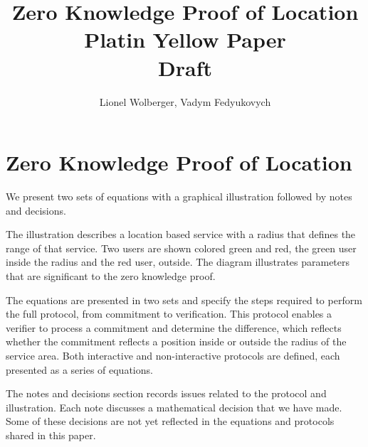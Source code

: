 \documentclass{article}
\begin{document}
\pagecolor{yellow}


\title{
	Zero Knowledge Proof of Location\\
	\small{
	Platin Yellow Paper\\
	Draft}
}
\author{Lionel Wolberger, Vadym Fedyukovych}
\maketitle

\section{Zero Knowledge Proof of Location}

We present two sets of equations with a graphical illustration followed by notes and decisions. 

The illustration describes a location based service with a radius that defines the range of that service. Two users are shown colored green and red, the green user inside the radius and the red user, outside. The diagram illustrates parameters that are significant to the zero knowledge proof. 

The equations are presented in two sets and specify the steps required to perform the full protocol, from commitment to verification. This protocol enables a verifier to process a commitment and determine the difference, which reflects whether the commitment reflects a position inside or outside the radius of the service area. Both interactive  and non-interactive protocols are defined, each presented as a series of equations. 

The notes and decisions section records issues related to the protocol and illustration. Each note discusses a mathematical decision that we have made. Some of these decisions are not yet reflected in the equations and protocols shared in this paper. 
\end{document}
